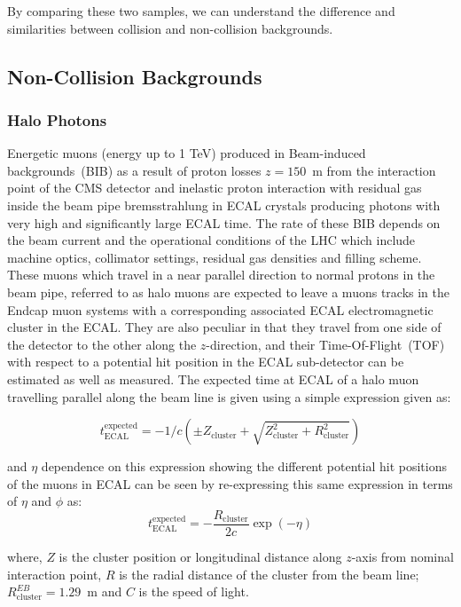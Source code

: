 By comparing these two samples, we can understand the difference and similarities between collision and non-collision backgrounds. 

\subsection{Non-Collision Backgrounds}
\subsubsection{Halo Photons}
Energetic muons (energy up to 1 TeV) produced in Beam-induced backgrounds~(BIB) as a result of proton losses $z = 150$~m from the interaction point of the CMS detector and inelastic proton interaction with residual gas inside the beam pipe bremsstrahlung in ECAL crystals producing photons with very high \pt and significantly large ECAL time. The rate of these BIB depends on the beam current and the operational conditions of the LHC which include machine optics, collimator settings, residual gas densities and filling scheme. These muons which travel in a near parallel direction to normal protons in the beam pipe, referred to as halo muons are expected to leave a muons tracks  in the Endcap muon systems with a corresponding associated ECAL electromagnetic cluster in the ECAL. They are also peculiar in that they travel from one side of the detector to the other along the $z$-direction, and their  Time-Of-Flight~(TOF) with respect to a potential hit position in the ECAL sub-detector can be estimated as well as measured.
The expected time at ECAL of a  halo muon travelling parallel along the beam line is given using a simple expression given as:

\begin{equation}
t^{\mbox{expected}}_{\mbox{ECAL}} = -1/c\left( \pm Z_{\mbox{cluster}} + \sqrt{Z^{2}_{\mbox{cluster}} + R^{2}_{\mbox{cluster}}}  \right)
\end{equation}

and $\eta$ dependence on this expression showing the different potential hit positions of the muons in ECAL can be seen by re-expressing this same expression in terms of $\eta$ and $\phi$ as:
\begin{equation}
t^{\mbox{expected}}_{\mbox{ECAL}} = - \frac{R_{\mbox{cluster}}}{2c} \exp{(-\eta)}
\end{equation} 

where, $Z$ is the cluster position or longitudinal distance along $z$-axis from nominal interaction point, $R$ is the radial distance of the cluster from the beam line; $R^{EB}_{\mbox{cluster}} = 1.29$~m and $C$ is the speed of light.

